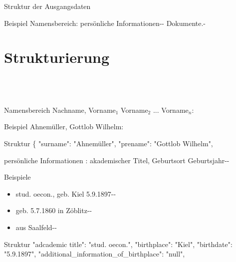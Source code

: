 \documentclass[12pt]{beamer}
\begin{document}
\begin{large}
\begin{frame}{Struktur der Ausgangsdaten}
 
 \vspace*{\fill}
 \begin{block}{Beispiel}
 \normalsize Namensbereich: persönliche Informationen-{}- Dokumente.-
 \end{block}
\end{frame} 


\section{Strukturierung}
 \subsection*{~}
 
\begin{frame}{Namensbereich}
 Nachname, Vorname$_1$ Vorname$_2$ ... Vorname$_n$:

 \vspace*{\fill}
 \begin{block}{Beispiel}
 \normalsize Ahnemüller, Gottlob Wilhelm:
 \end{block}

 \begin{block}{Struktur}
  \normalsize
  \{
  \newline
  \hspace*{0.5cm}
  "{}surname"{}: "{}Ahnemüller"{},
  \newline
  \hspace*{0.5cm}    
  "{}prename"{}: "{}Gottlob Wilhelm"{},
 \end{block} 
\end{frame}


\begin{frame}{persönliche Informationen}
 : akademischer Titel, Geburtsort Geburtsjahr-{}-

 \vspace*{\fill}
 \begin{block}{Beispiele}
  \normalsize
  \begin{itemize}
   \item stud. oecon., geb. Kiel 5.9.1897-{}-
   \item geb. 5.7.1860 in  Zöblitz-{}-
   \item aus Saalfeld-{}-
  \end{itemize}
 \end{block}
 
 \begin{block}{Struktur}
  \normalsize
  \hspace*{0.5cm}
  "{}adcademic title"{}: "{}stud. oecon."{},
  \newline 
  \hspace*{0.5cm}    
  "{}birthplace"{}: "{}Kiel"{},
  \newline
  \hspace*{0.5cm}
  "{}birthdate"{}: "{}5.9.1897"{},    
  \newline
  \hspace*{0.5cm}
  "{}additional\_information\_of\_birthplace"{}: "{}null"{},
 \end{block} 
\end{frame}


\end{large}
\end{document}
